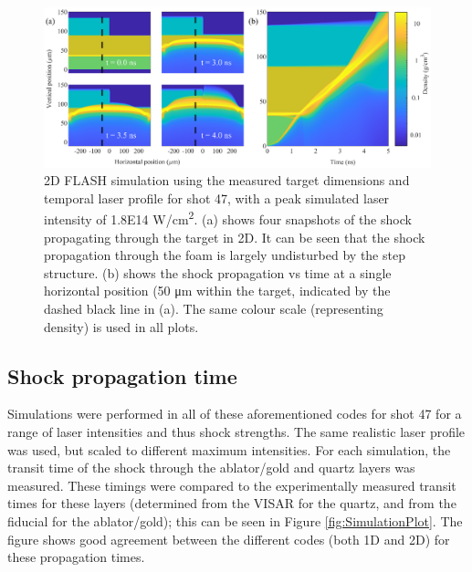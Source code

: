 \begin{figure} [h!]
\begin{centering}
\includegraphics[width=1\textwidth]{figures/Experiment/SimSubPlot.eps}%
\caption{\label{fig:SimSubPlot} 2D FLASH simulation using the measured target dimensions and temporal laser profile for shot 47, with a peak simulated laser intensity of \num{1.8E14} \si[per-mode=symbol]{W/cm^2}. (a) shows four snapshots of the shock propagating through the target in 2D. It can be seen that the shock propagation through the foam is largely undisturbed by the step structure. (b) shows the shock propagation vs time at a single horizontal position (50 \si[per-mode=symbol]{\micro\meter} within the target, indicated by the dashed black line in (a). The same colour scale (representing density) is used in all plots.}
\end{centering}
\end{figure}

\subsection{Shock propagation time} \label{Shock propagation time}

Simulations were performed in all of these aforementioned codes for shot 47 for a range of laser intensities and thus shock strengths. The same realistic laser profile was used, but scaled to different maximum intensities. For each simulation, the transit time of the shock through the ablator/gold and quartz layers was measured. These timings were compared to the experimentally measured transit times for these layers (determined from the VISAR for the quartz, and from the fiducial for the ablator/gold); this can be seen in Figure \ref{fig:SimulationPlot}. The figure shows good agreement between the different codes (both 1D and 2D) for these propagation times. 

